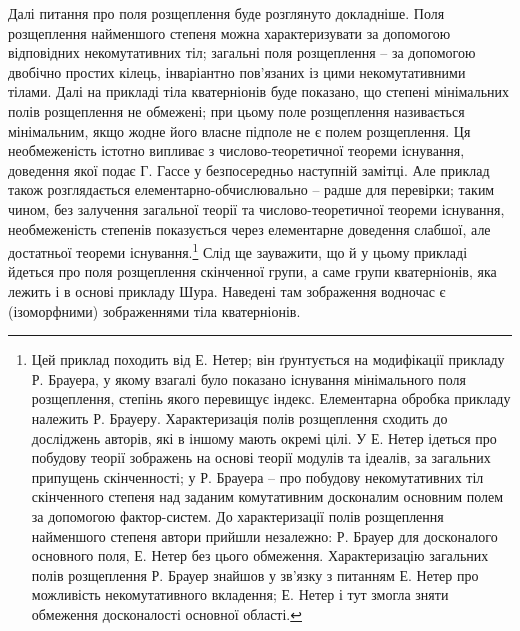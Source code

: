 \documentclass[11pt]{article}
\begin{document}
\setcounter{footnote}{0}

\noindent Далі питання про поля розщеплення буде розглянуто докладніше. Поля розщеплення найменшого степеня можна характеризувати за допомогою відповідних некомутативних тіл; загальні поля розщеплення -- за допомогою двобічно простих кілець, інваріантно пов'язаних із цими некомутативними тілами. Далі на прикладі тіла кватерніонів буде показано, що степені мінімальних полів розщеплення не обмежені; при цьому поле розщеплення називається мінімальним, якщо жодне його власне підполе не є полем розщеплення. Ця необмеженість істотно випливає з числово-теоретичної теореми існування, доведення якої подає Г. Гассе у безпосередньо наступній замітці. Але приклад також розглядається елементарно-обчислювально -- радше для перевірки; таким чином, без залучення загальної теорії та числово-теоретичної теореми існування, необмеженість степенів показується через елементарне доведення слабшої, але достатньої теореми існування.\footnote{Цей приклад походить від Е. Нетер; він ґрунтується на модифікації прикладу Р. Брауера, у якому взагалі було показано існування мінімального поля розщеплення, степінь якого перевищує індекс. Елементарна обробка прикладу належить Р. Брауеру. Характеризація полів розщеплення сходить до досліджень авторів, які в іншому мають окремі цілі. У Е. Нетер ідеться про побудову теорії зображень на основі теорії модулів та ідеалів, за загальних припущень скінченності; у Р. Брауера -- про побудову некомутативних тіл скінченного степеня над заданим комутативним досконалим основним полем за допомогою фактор-систем. До характеризації полів розщеплення найменшого степеня автори прийшли незалежно: Р. Брауер для досконалого основного поля, Е. Нетер без цього обмеження. Характеризацію загальних полів розщеплення Р. Брауер знайшов у зв'язку з питанням Е. Нетер про можливість некомутативного вкладення; Е. Нетер і тут змогла зняти обмеження досконалості основної області.} Слід ще зауважити, що й у цьому прикладі йдеться про поля розщеплення скінченної групи, а саме групи кватерніонів, яка лежить і в основі прикладу Шура. Наведені там зображення водночас є (ізоморфними) зображеннями тіла кватерніонів.
\end{document}
